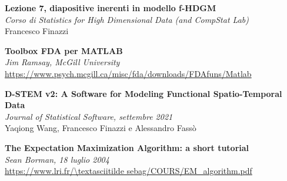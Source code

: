 \begin{thebibliography}{88}
	\label{bibliografia}
	
	\textbf{Lezione 7, diapositive inerenti in modello f-HDGM}\\
	\textit{Corso di Statistics for High Dimensional Data (and CompStat Lab)}\\
	Francesco Finazzi
	
	\textbf{Toolbox FDA per MATLAB}\\
	\textit{Jim Ramsay, McGill University} \\
	\url{https://www.psych.mcgill.ca/misc/fda/downloads/FDAfuns/Matlab}
	
	\textbf{D-STEM v2: A Software for Modeling Functional Spatio-Temporal Data}\\ \textit{Journal of Statistical Software, settembre 2021}\\
	Yaqiong Wang, Francesco Finazzi e Alessandro Fassò
	
	\textbf{The Expectation Maximization Algorithm: a short tutorial} \\
	\textit{Sean Borman, \num{18} luglio \num{2004}} \\
	\url{https://www.lri.fr/\textasciitilde sebag/COURS/EM_algorithm.pdf}
\end{thebibliography}